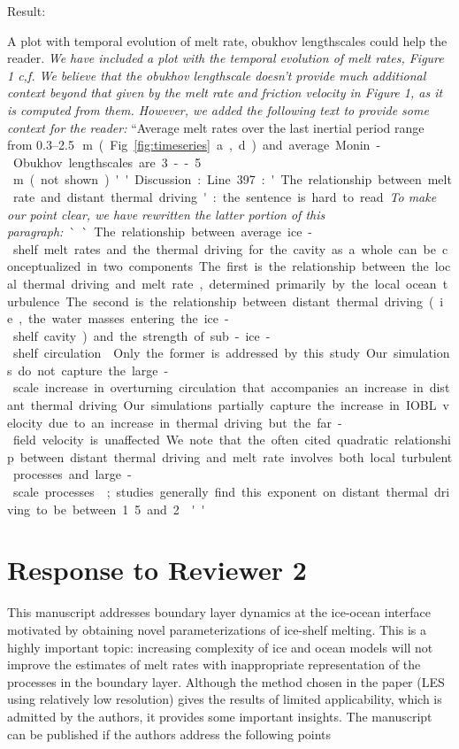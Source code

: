 \documentclass[tc, manuscript]{copernicus}
\begin{document}
Result:

A plot with temporal evolution of melt rate, obukhov lengthscales could help the reader.
\textit{We have included a plot with the temporal evolution of melt rates, Figure 1 c,f. We believe that the obukhov lengthscale doesn't provide much additional context beyond that given by the melt rate and friction velocity in Figure 1, as it is computed from them. However, we added the following text to provide some context for the reader:}
``Average melt rates over the last inertial period range from 0.3--2.5\unit\,{m} (Fig. \ref{fig:timeseries}a,d) and average Monin-Obukhov lengthscales are 3--5\,\unit{m} (not shown).''

Discussion :

Line 397: 'The relationship between melt rate and distant thermal driving' : the sentence is hard to read.
\textit{To make our point clear, we have rewritten the latter portion of this paragraph:}
``The relationship between average ice-shelf melt rates and the thermal driving for the cavity as a whole can be conceptualized in two components. The first is the relationship between the local thermal driving and melt rate, determined primarily by the local ocean turbulence. The second is the relationship between distant thermal driving (i.e., the water masses entering the ice-shelf cavity) and the strength of sub-ice-shelf circulation \citep{holland_response_2008}. Only the former is addressed by this study. Our simulations do not capture the large-scale increase in overturning circulation that accompanies an increase in distant thermal driving. Our simulations partially capture the increase in IOBL velocity due to an increase in thermal driving but the far-field velocity is unaffected. We note that the often cited quadratic relationship between distant thermal driving and melt rate involves both local turbulent processes and large-scale processes \citep{holland_response_2008}; studies generally find this exponent on distant thermal driving to be between 1.5 and 2 \citep{favier_assessment_2019, jourdain_ocean_2017, little_how_2009}.''


\section{Response to Reviewer 2}

This manuscript addresses boundary layer dynamics at the ice-ocean interface motivated by obtaining novel parameterizations of ice-shelf melting. This is a highly important topic: increasing complexity of ice and ocean models will not improve the estimates of melt rates with inappropriate representation of the processes in the boundary layer. Although the method chosen in the paper (LES using relatively low resolution) gives the results of limited applicability, which is admitted by the authors, it provides some important insights. The manuscript can be published if the authors address the following points
\end{document}

